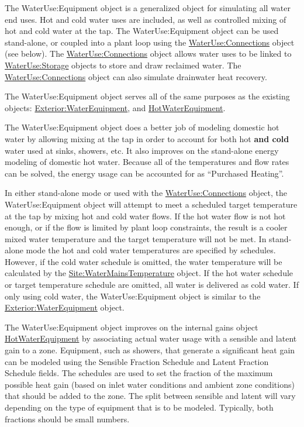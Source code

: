 The WaterUse:Equipment object is a generalized object for simulating all water end uses. Hot and cold water uses are included, as well as controlled mixing of hot and cold water at the tap. The WaterUse:Equipment object can be used stand-alone, or coupled into a plant loop using the \hyperref[wateruseconnections]{WaterUse:Connections} object (see below). The \hyperref[wateruseconnections]{WaterUse:Connections} object allows water uses to be linked to \hyperref[waterusestorage]{WaterUse:Storage} objects to store and draw reclaimed water. The \hyperref[wateruseconnections]{WaterUse:Connections} object can also simulate drainwater heat recovery.

The WaterUse:Equipment object serves all of the same purposes as the existing objects: \hyperref[exteriorwaterequipment]{Exterior:WaterEquipment}, and \hyperref[hotwaterequipment]{HotWaterEquipment}.

The WaterUse:Equipment object does a better job of modeling domestic hot water by allowing mixing at the tap in order to account for both hot \textbf{and cold} water used at sinks, showers, etc. It also improves on the stand-alone energy modeling of domestic hot water. Because all of the temperatures and flow rates can be solved, the energy usage can be accounted for as ``Purchased Heating''.

In either stand-alone mode or used with the \hyperref[wateruseconnections]{WaterUse:Connections} object, the WaterUse:Equipment object will attempt to meet a scheduled target temperature at the tap by mixing hot and cold water flows. If the hot water flow is not hot enough, or if the flow is limited by plant loop constraints, the result is a cooler mixed water temperature and the target temperature will not be met. In stand-alone mode the hot and cold water temperatures are specified by schedules. However, if the cold water schedule is omitted, the water temperature will be calculated by the \hyperref[sitewatermainstemperature]{Site:WaterMainsTemperature} object. If the hot water schedule or target temperature schedule are omitted, all water is delivered as cold water. If only using cold water, the WaterUse:Equipment object is similar to the \hyperref[exteriorwaterequipment]{Exterior:WaterEquipment} object.

The WaterUse:Equipment object improves on the internal gains object \hyperref[hotwaterequipment]{HotWaterEquipment} by associating actual water usage with a sensible and latent gain to a zone. Equipment, such as showers, that generate a significant heat gain can be modeled using the Sensible Fraction Schedule and Latent Fraction Schedule fields. The schedules are used to set the fraction of the maximum possible heat gain (based on inlet water conditions and ambient zone conditions) that should be added to the zone. The split between sensible and latent will vary depending on the type of equipment that is to be modeled. Typically, both fractions should be small numbers.


